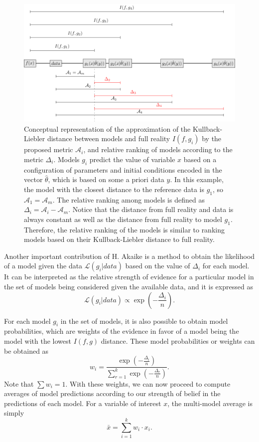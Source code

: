 \documentclass[gmd, manuscript]{copernicus}
\begin{document}
\begin{figure}[ht]
   \centering
   \includegraphics[width=14cm]{Figures/distances.pdf} %
   \caption{Conceptual representation of the approximation of the Kullback-Liebler distance between models and full reality $I(f, g_i)$ by the proposed metric $\mathcal{A}_i$, and relative ranking of models according to the metric $\Delta_i$. Models $g_i$ predict the value of variable $x$ based on a configuration of parameters and initial conditions encoded in the vector $\hat{\theta}$, which is based on some a priori data $y$. In this example, the model with the closest distance to the reference data is $g_1$, so $\mathcal{A}_1 = \mathcal{A}_m$. The relative ranking among models is defined as $\Delta_i = \mathcal{A}_i - \mathcal{A}_m$. Notice that the distance from full reality and data is always constant as well as the distance from full reality to model $g_1$. Therefore, the relative ranking of the models is similar to ranking models based on their Kullback-Liebler distance to full reality.}
   \label{fig:concept}
\end{figure}

Another important contribution of H. Akaike is a method to obtain the likelihood of a model given the data $\mathcal{L}(g_i | data)$ based on the value of $\Delta_i$ for each model. It can be interpreted as the relative strength of evidence for a particular model in the set of models being considered given the available data, and it is expressed as
\begin{equation}
\mathcal{L}(g_i | data) \varpropto \exp \left( - \frac{ \Delta_i}{n} \right).
\end{equation}

For each model $g_i$ in the set of models, it is also possible to obtain model probabilities, which are weights of the evidence in favor of a model being the model with the lowest $I(f, g)$ distance. These model probabilities or weights can be obtained as
\begin{equation}
w_i = \frac{\exp (-\frac{\Delta_i}{n})}{\sum_{r=1}^k \exp(- \frac{\Delta_r}{n})}.
\end{equation}
Note that $\sum w_i =1$. 
With these weights, we can now proceed to compute averages of model predictions according to our strength of belief in the predictions of each model. 
For a variable of interest $x$, the multi-model average is simply
\begin{equation}
\bar{x} = \sum_{i=1}^k w_i \cdot x_i.
\end{equation}
\end{document}
